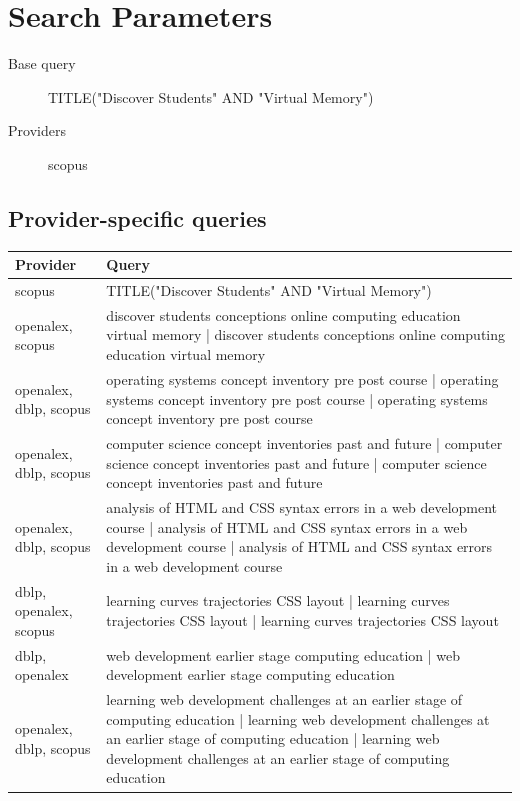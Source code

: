 \documentclass{article}
\begin{document}
\section{Search Parameters}

\begin{description}
\item[Base query] TITLE("Discover Students" AND "Virtual Memory")
\item[Providers] scopus
\end{description}

\subsection{Provider-specific queries}
\begin{longtable}{lp{10cm}}
\toprule
Provider & Query \\
\midrule
scopus & TITLE("Discover Students" AND "Virtual Memory") \\
openalex, scopus & discover students conceptions online computing education virtual memory | discover students conceptions online computing education virtual memory \\
openalex, dblp, scopus & operating systems concept inventory pre post course | operating systems concept inventory pre post course | operating systems concept inventory pre post course \\
openalex, dblp, scopus & computer science concept inventories past and future | computer science concept inventories past and future | computer science concept inventories past and future \\
openalex, dblp, scopus & analysis of HTML and CSS syntax errors in a web development course | analysis of HTML and CSS syntax errors in a web development course | analysis of HTML and CSS syntax errors in a web development course \\
dblp, openalex, scopus & learning curves trajectories CSS layout | learning curves trajectories CSS layout | learning curves trajectories CSS layout \\
dblp, openalex & web development earlier stage computing education | web development earlier stage computing education \\
openalex, dblp, scopus & learning web development challenges at an earlier stage of computing education | learning web development challenges at an earlier stage of computing education | learning web development challenges at an earlier stage of computing education \\

\end{longtable}
\end{document}
